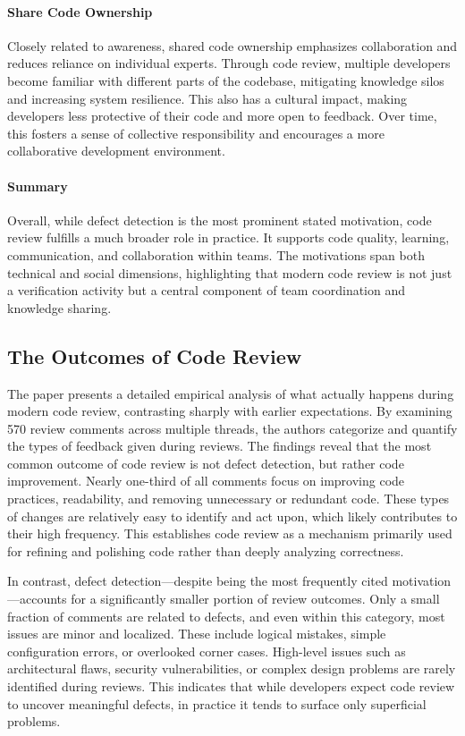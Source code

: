 \paragraph{Share Code Ownership}
Closely related to awareness, shared code ownership emphasizes collaboration and reduces reliance on individual experts. Through code review, multiple developers become familiar with different parts of the codebase, mitigating knowledge silos and increasing system resilience. This also has a cultural impact, making developers less protective of their code and more open to feedback. Over time, this fosters a sense of collective responsibility and encourages a more collaborative development environment.

\paragraph{Summary}
Overall, while defect detection is the most prominent stated motivation, code review fulfills a much broader role in practice. It supports code quality, learning, communication, and collaboration within teams. The motivations span both technical and social dimensions, highlighting that modern code review is not just a verification activity but a central component of team coordination and knowledge sharing.

\subsection{The Outcomes of Code Review}
The paper presents a detailed empirical analysis of what actually happens during modern code review, contrasting sharply with earlier expectations. By examining 570 review comments across multiple threads, the authors categorize and quantify the types of feedback given during reviews. The findings reveal that the most common outcome of code review is not defect detection, but rather code improvement. Nearly one-third of all comments focus on improving code practices, readability, and removing unnecessary or redundant code. These types of changes are relatively easy to identify and act upon, which likely contributes to their high frequency. This establishes code review as a mechanism primarily used for refining and polishing code rather than deeply analyzing correctness.

In contrast, defect detection—despite being the most frequently cited motivation—accounts for a significantly smaller portion of review outcomes. Only a small fraction of comments are related to defects, and even within this category, most issues are minor and localized. These include logical mistakes, simple configuration errors, or overlooked corner cases. High-level issues such as architectural flaws, security vulnerabilities, or complex design problems are rarely identified during reviews. This indicates that while developers expect code review to uncover meaningful defects, in practice it tends to surface only superficial problems.


